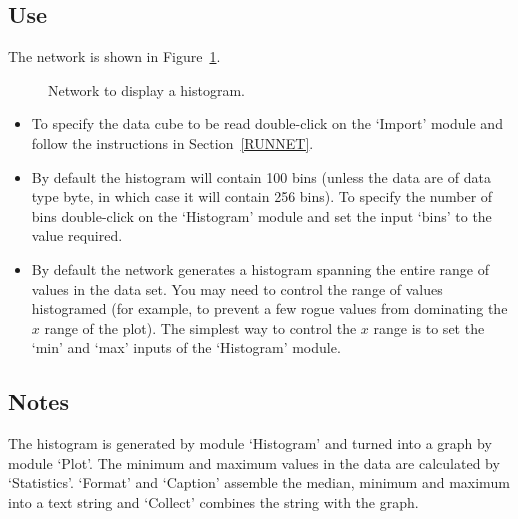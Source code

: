 \documentclass[twoside,11pt]{article}
\begin{document}
\subsection{Use}

The network is shown in Figure~\ref{HISTNETF}.

\begin{figure}[htbp]

\begin{center}
\leavevmode
\epsfxsize=371pt
\end{center}

\caption[Network to display a histogram.]{Network to display a histogram.
\label{HISTNETF} }

\end{figure}

\begin{itemize}

  \item To specify the data cube to be read double-click on the `Import'
   module and follow the instructions in Section~\ref{RUNNET}.

  \item By default the histogram will contain 100 bins (unless the data
   are of data type byte, in which case it will contain 256 bins). To
   specify the number of bins double-click on the `Histogram' module
   and set the input `bins' to the value required.

  \item By default the network generates a histogram spanning the
   entire range of values in the data set. You may need to control
   the range of values histogramed (for example, to prevent a few
   rogue values from dominating the $x$ range of the plot). The
   simplest way to control the $x$ range is to set the `min' and `max'
   inputs of the `Histogram' module.

\end{itemize}

\subsection{Notes}

The histogram is generated by module `Histogram' and turned into a graph
by module `Plot'. The minimum and maximum values in the data are
calculated by `Statistics'. `Format' and `Caption' assemble the median,
minimum and maximum into a text string and `Collect' combines the string
with the graph.
\end{document}
